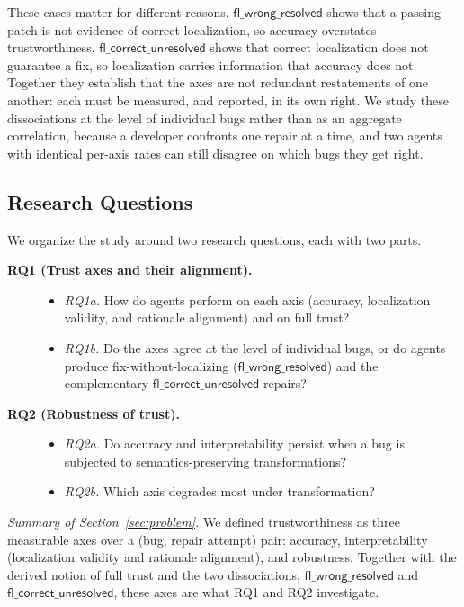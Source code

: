 These cases matter for different reasons. $\mathsf{fl\_wrong\_resolved}$ shows that a
passing patch is not evidence of correct localization, so accuracy overstates
trustworthiness. $\mathsf{fl\_correct\_unresolved}$ shows that correct
localization does not guarantee a fix, so localization carries information that accuracy
does not. Together they establish that the axes are not redundant restatements of one
another: each must be measured, and reported, in its own right. We study these dissociations
at the level of individual bugs rather than as an aggregate correlation, because a developer
confronts one repair at a time, and two agents with identical per-axis rates can still
disagree on which bugs they get right.

\subsection{Research Questions}
\label{subsec:rqs}

We organize the study around two research questions, each with two parts.

\begin{description}
  \item[\textbf{RQ1 (Trust axes and their alignment).}] \hfill
  \begin{itemize}
    \item \emph{RQ1a.} How do agents perform on each axis (accuracy, localization
    validity, and rationale alignment) and on full trust?
    \item \emph{RQ1b.} Do the axes agree at the level of individual bugs, or do agents
    produce fix-without-localizing ($\mathsf{fl\_wrong\_resolved}$) and the complementary
    $\mathsf{fl\_correct\_unresolved}$ repairs?
  \end{itemize}
  \item[\textbf{RQ2 (Robustness of trust).}] \hfill
  \begin{itemize}
    \item \emph{RQ2a.} Do accuracy and interpretability persist when a bug is subjected to
    semantics-preserving transformations?
    \item \emph{RQ2b.} Which axis degrades most under transformation?
  \end{itemize}
\end{description}

\noindent
\emph{Summary of Section~\ref{sec:problem}.} We defined trustworthiness as three
measurable axes over a (bug, repair attempt) pair: accuracy, interpretability (localization
validity and rationale alignment), and robustness. Together with the derived notion of full
trust and the two dissociations, $\mathsf{fl\_wrong\_resolved}$ and
$\mathsf{fl\_correct\_unresolved}$, these axes are what RQ1 and RQ2 investigate.
